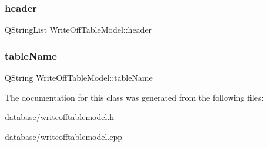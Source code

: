 \subsubsection{\texorpdfstring{header}{header}}
{\footnotesize\ttfamily Q\+String\+List Write\+Off\+Table\+Model\+::header\hspace{0.3cm}{\ttfamily [private]}}

\mbox{\label{class_write_off_table_model_a07073c77e57b3a366ad2280e838d05ed}} 
\subsubsection{\texorpdfstring{tableName}{tableName}}
{\footnotesize\ttfamily Q\+String Write\+Off\+Table\+Model\+::table\+Name\hspace{0.3cm}{\ttfamily [private]}}



The documentation for this class was generated from the following files\+:\begin{DoxyCompactItemize}
\item 
database/\mbox{\hyperlink{writeofftablemodel_8h}{writeofftablemodel.\+h}}\item 
database/\mbox{\hyperlink{writeofftablemodel_8cpp}{writeofftablemodel.\+cpp}}\end{DoxyCompactItemize}

